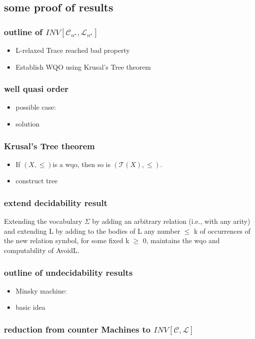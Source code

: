 \subsection{some proof of results}
\begin{frame}
    \frametitle{outline of $INV[\mathcal{C}_{n^{\star}},\mathcal{L}_{n^{\star}}]$}
    \begin{itemize}
        \item L-relaxed Trace reached bad property
        \item Establish WQO using Krusal's Tree theorem
    \end{itemize}
\end{frame}
\begin{frame}
    \frametitle{well quasi order}
    \begin{itemize}
        \item possible case:
        \item solution
    \end{itemize}
\end{frame}
\begin{frame}
    \frametitle{Krusal's Tree theorem}
    \begin{itemize}
        \item If $(X,\le)$is a wqo, then so is $(\mathcal{T}(X),\le)$.
        \item construct tree
    \end{itemize}
\end{frame}
\begin{frame}
    \frametitle{extend decidability result}
    \begin{corollary}
        Extending the vocabulary $\varSigma $ by adding an arbitrary relation (i.e., with any arity) and extending L by adding to the bodies of L any number $\le$ k of occurrences of the new relation symbol, for some fixed k $\geqslant $ 0, maintains the wqo and computability of AvoidL.
    \end{corollary}
\end{frame}
\begin{frame}
    \frametitle{outline of undecidability results}
    \begin{itemize}
        \item Minsky machine:
        \item basic idea
    \end{itemize}
\end{frame}
\begin{frame}
    \frametitle{reduction from counter Machines to $INV[\mathcal{C},\mathcal{L}]$}
\end{frame}
